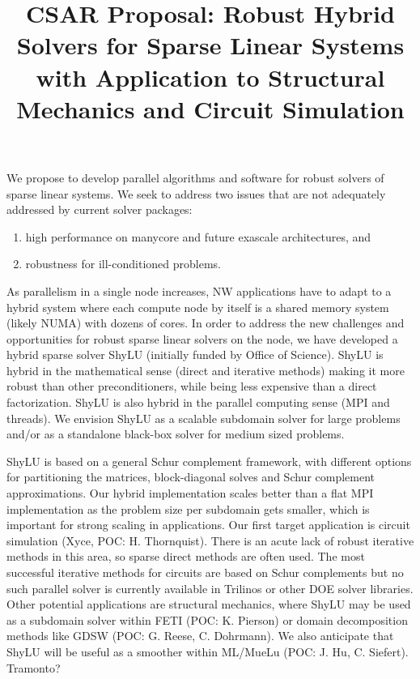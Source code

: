 \documentclass[10pt]{amsart}
\date{}
\title{CSAR Proposal: Robust Hybrid Solvers for Sparse Linear Systems with Application to Structural Mechanics and Circuit Simulation}
\begin{document}
\maketitle

We propose to develop parallel algorithms and software for robust solvers
of sparse linear systems. We seek to address two issues that
are not adequately addressed by current solver packages:
\begin{enumerate}
\item high performance on manycore and future exascale architectures, and
\item robustness for ill-conditioned problems.
\end{enumerate}

As parallelism in a single node increases, NW applications
have to adapt to a hybrid system where each compute node by itself
is a shared memory system (likely NUMA) with dozens of cores. 
In order to address the new challenges and opportunities 
for robust sparse linear solvers on the node,
we have developed a hybrid sparse solver ShyLU (initially funded by 
Office of Science). ShyLU is hybrid in the
mathematical sense (direct and iterative methods) making it more
robust than other preconditioners, while being less expensive
than a direct factorization.  ShyLU is also hybrid in the parallel
computing sense (MPI and threads). We envision ShyLU as a scalable
subdomain solver for large problems and/or as a standalone black-box solver
for medium sized problems.

ShyLU is based on a general Schur complement framework, with different options
for partitioning the matrices, block-diagonal solves and Schur complement
approximations.  Our hybrid implementation scales better than
a flat MPI implementation as the problem size per subdomain gets smaller, 
which is important for strong scaling in applications.
Our first target application is circuit simulation (Xyce, POC: H. Thornquist). 
There is an acute lack of robust iterative methods in this area, so sparse
direct methods are often used. The most successful iterative methods
for circuits are based on Schur complements but no such parallel solver
is currently available in Trilinos or other DOE solver libraries.
%
Other potential applications are structural mechanics, where ShyLU
may be used as a subdomain solver within FETI (POC: K. Pierson) or
domain decomposition methods like GDSW (POC: G. Reese, C. Dohrmann). 
We also anticipate that ShyLU
will be useful as a smoother within ML/MueLu (POC: J. Hu, C. Siefert).
Tramonto?
\end{document}
